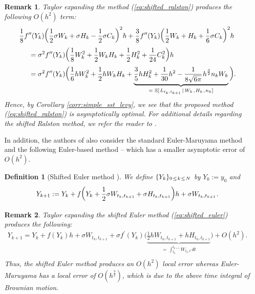 \documentclass[sn-mathphys-num]{sn-jnl}%
\newtheorem{remark}{Remark}%
\newtheorem{definition}{Definition}%
\newcommand{\E}{\mathbb{E}}
\newcommand{\m}{\hspace{0.25mm}}
\newcommand{\mm}{\hspace{5mm}}
\begin{document}
\begin{remark}
Taylor expanding the method (\ref{eq:shifted_ralston}) produces the following $O(h^2)$ term:\vspace*{-1mm}
\begin{align*}
&\frac{1}{8}f^{\prime\prime}(Y_k)\bigg(\frac{1}{2}\sigma W_k + \sigma H_k - \frac{1}{2}\sigma C_k\bigg)^2 h + \frac{3}{8}f^{\prime\prime}(Y_k)\bigg(\frac{1}{2}W_k + H_k + \frac{1}{6}\sigma C_k\bigg)^2 h \\
&\mm = \sigma^2 f^{\prime\prime}(Y_k)\bigg(\frac{1}{8} W_k^2 + \frac{1}{2}W_k H_k + \frac{1}{2}H_k^2+ \frac{1}{24}C_k^2\bigg)h\\
&\mm = \sigma^2 f^{\prime\prime}(Y_k)\bigg(\frac{1}{6}h W_k^2 + \frac{1}{2}h W_k H_k + \underbrace{\frac{3}{5}h H_k^2 + \frac{1}{30}h^2 - \frac{1}{8\sqrt{6\pi}}\m h^\frac{3}{2} n_k W_k}_{=\,\, \E[\m L_{t_k,t_{k+1}}\,|\, W_k\m,\m H_k\m,\m n_k]}\bigg).
\end{align*}
Hence, by Corollary \ref{corr:simple_sst_levy}, we see that the proposed method (\ref{eq:shifted_ralston}) is asymptotically optimal.
For additional details regarding the shifted Ralston method, we refer the reader to \cite{foster2024splitting}.
\end{remark}\medbreak

In addition, the authors of \cite{foster2024splitting} also consider the standard Euler-Maruyama method and the following Euler-based method -- which has a smaller asymptotic error of $O(h^2)$.\medbreak

\begin{definition}[Shifted Euler method \cite{foster2024splitting}] We define $\{Y_k\}_{0\m\leq\m k\m\leq\m N}$ by $Y_0 := y_0$ and
\begin{align}\label{eq:shifted_euler}
Y_{k+1} := Y_k + f\bigg(Y_k + \frac{1}{2}\sigma W_{t_k, t_{k+1}} + \sigma H_{t_k, t_{k+1}}\bigg)h + \sigma W_{t_k, t_{k+1}}\m.
\end{align}
\end{definition}
\begin{remark}\label{rmk:shifted_euler}
Taylor expanding the shifted Euler method (\ref{eq:shifted_euler}) produces the following:
\begin{align*}
Y_{k+1} = Y_k + f(Y_k)h + \sigma W_{t_k, t_{k+1}} + \sigma f^\prime(Y_k)\bigg(\underbrace{\frac{1}{2}h W_{t_k, t_{k+1}} + h H_{t_k, t_{k+1}}}_{=\,\int_{t_k}^{t_{k+1}} W_{t_k, t}\, dt}\bigg) + O(h^2).\\[-20pt]
\end{align*}
Thus, the shifted Euler method produces an $O(h^2)$ local error whereas Euler-Maruyama has a local error of $O(h^\frac{3}{2})$, which is due to the above time integral of Brownian motion.
\end{remark}\medbreak
\end{document}
